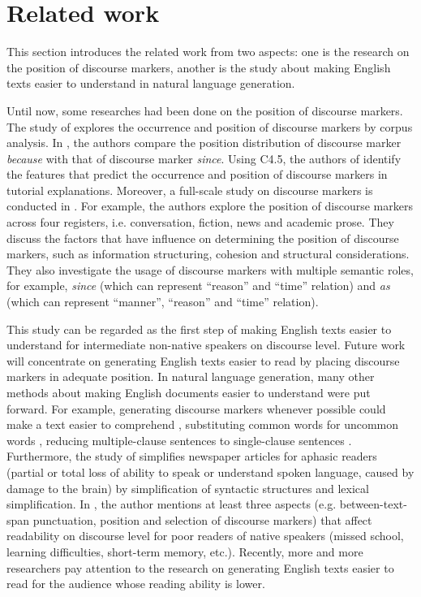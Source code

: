 \documentclass[english]{jnlp_1.3e}
\begin{document}
\section{Related work} 

This section introduces the related work from two aspects: 
one is the research on the position of discourse markers, another is 
the study about making English texts easier to understand in natural
language generation.

Until now, some researches had been done on the position of discourse
markers. The study of \cite{Moser95b} explores the occurrence and position 
of discourse markers by corpus analysis. In \cite{Moser95a},
the authors compare the position distribution of discourse marker 
\textit{because} with that of discourse marker \textit{since}. 
Using C4.5, the authors of \cite{Eugenio97} identify the features that predict 
the occurrence and position of discourse markers in tutorial explanations. 
Moreover, a full-scale study on discourse markers is conducted in \cite{Biber99}.
For example, the authors explore the position of discourse markers across four registers, i.e. 
conversation, fiction, news and academic prose. They 
discuss the factors that have influence on determining the position
of discourse markers, such as information structuring, cohesion 
and structural considerations. They also investigate the 
usage of discourse markers with multiple semantic roles,
for example, \textit{since} (which can represent ``reason'' 
and ``time'' relation) and \textit{as} (which can represent ``manner'', 
``reason'' and ``time'' relation).

This study can be regarded as the first step of making 
English texts easier to understand for intermediate non-native speakers
on discourse level. Future work will concentrate on generating English 
texts easier to read by placing discourse markers in adequate position. 
In natural language generation, many other methods about 
making English documents easier to understand were put forward. 
For example, generating discourse markers whenever possible could make 
a text easier to comprehend \cite{Scott90}, substituting common words for uncommon 
words \cite{Devlin98}, reducing multiple-clause sentences to single-clause sentences 
\cite{Chandrasekar97}. Furthermore, the study of \cite{Devlin00} 
simplifies newspaper articles for aphasic readers (partial or total 
loss of ability to speak or understand spoken language, caused 
by damage to the brain) by simplification of syntactic structures and 
lexical simplification. In \cite{Will04}, the author mentions at least three aspects 
(e.g. between-text-span punctuation, position and selection of discourse markers) 
that affect readability on discourse level for poor readers of native speakers (missed school, 
learning difficulties, short-term memory, etc.).
Recently, more and more researchers pay attention to the research on generating
English texts easier to read for the audience whose reading 
ability is lower.  
\end{document}
